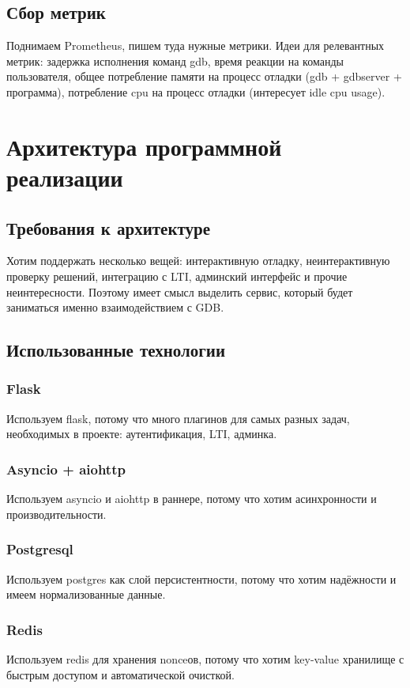 \documentclass[a4paper,article,14pt]{extarticle}
\begin{document}
\subsection{Сбор метрик}

Поднимаем Prometheus, пишем туда нужные метрики. Идеи для релевантных метрик: задержка исполнения команд gdb, время реакции на команды пользователя, общее потребление памяти на процесс отладки (gdb + gdbserver + программа), потребление cpu на процесс отладки (интересует idle cpu usage).

\section{Архитектура программной реализации}

\subsection{Требования к архитектуре}

Хотим поддержать несколько вещей: интерактивную отладку, неинтерактивную проверку решений, интеграцию с LTI, админский интерфейс и прочие неинтересности. Поэтому имеет смысл выделить сервис, который будет заниматься именно взаимодействием с GDB.

\subsection{Использованные технологии}

\subsubsection{Flask}
Используем flask, потому что много плагинов для самых разных задач, необходимых в проекте: аутентификация, LTI, админка.

\subsubsection{Asyncio + aiohttp}
Используем asyncio и aiohttp в раннере, потому что хотим асинхронности и производительности.

\subsubsection{Postgresql}
Используем postgres как слой персистентности, потому что хотим надёжности и имеем нормализованные данные.

\subsubsection{Redis}
Используем redis для хранения nonceов, потому что хотим key-value хранилище с быстрым доступом и автоматической очисткой.
\end{document}
